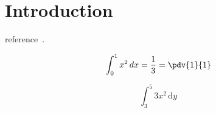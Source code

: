 \section{Introduction}

\blindtext
reference~\cite{Reynolds1}.


\[
    \int_0^1 x^2 \, dx = \frac{\text{1}}{3}= \pdv{1}{1}
\]


\[\int_{3}^{5} 3x^{2}\, \mathrm{d}y\]

